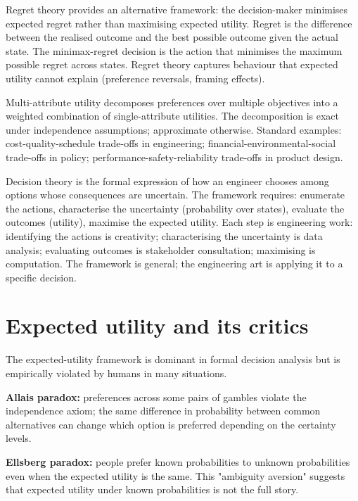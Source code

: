 Regret theory provides an alternative framework: the decision-maker minimises expected regret rather than maximising expected utility. Regret is the difference between the realised outcome and the best possible outcome given the actual state. The minimax-regret decision is the action that minimises the maximum possible regret across states. Regret theory captures behaviour that expected utility cannot explain (preference reversals, framing effects).

Multi-attribute utility decomposes preferences over multiple objectives into a weighted combination of single-attribute utilities. The decomposition is exact under independence assumptions; approximate otherwise. Standard examples: cost-quality-schedule trade-offs in engineering; financial-environmental-social trade-offs in policy; performance-safety-reliability trade-offs in product design.

\begin{archetype}
Decision theory is the formal expression of how an engineer chooses among options whose consequences are uncertain. The framework requires: enumerate the actions, characterise the uncertainty (probability over states), evaluate the outcomes (utility), maximise the expected utility. Each step is engineering work: identifying the actions is creativity; characterising the uncertainty is data analysis; evaluating outcomes is stakeholder consultation; maximising is computation. The framework is general; the engineering art is applying it to a specific decision.
\end{archetype}

\section{Expected utility and its critics}

The expected-utility framework is dominant in formal decision analysis but is empirically violated by humans in many situations.

\textbf{Allais paradox:} preferences across some pairs of gambles violate the independence axiom; the same difference in probability between common alternatives can change which option is preferred depending on the certainty levels.

\textbf{Ellsberg paradox:} people prefer known probabilities to unknown probabilities even when the expected utility is the same. This "ambiguity aversion" suggests that expected utility under known probabilities is not the full story.

